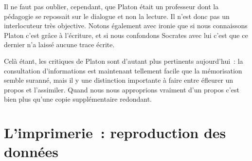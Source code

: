 Il ne faut pas oublier, cependant, que Platon était un professeur dont la pédagogie se repossait sur le dialogue et non la lecture. Il n'est donc pas un interlocuteur très objective. Notons également avec ironie que si nous connaissons Platon c'est grâce à l'écriture, et si nous confondons Socrates avec lui c'est que ce dernier n'a laissé aucune trace écrite.

Celà étant, les critiques de Platon sont d'autant plus pertinents aujourd'hui~: la consultation d'informations est maintenant tellement facile que la mémorisation semble suranné, mais il y une distinction importante à faire entre éfleurer un propos et l'assimiler. Quand nous nous approprions vraiment d'un propos c'est bien plus qu'une copie supplémentaire redondant.

\section{L'imprimerie~: reproduction des données}


